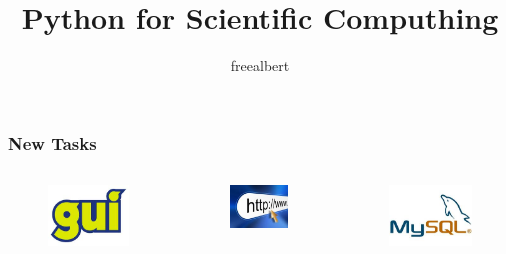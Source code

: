 \documentclass[compress=true]{beamer}
\title{Python for Scientific Computhing}
\author{freealbert}
\institute{Blog: http://dspandlinux.com\\Email: jim2429212@gmail.com}
\begin{document}
\begin{frame}
	\titlepage
\end{frame}
\begin{frame}
	\frametitle{New Tasks}
	\begin{columns}
		\begin{column}{0.333\textwidth}
			\begin{figure}
				\includegraphics[height=0.22\textheight]{gui.png}
			\end{figure}
		\end{column}
		\begin{column}{0.334\textwidth}
			\begin{figure}
				\includegraphics[height=0.22\textheight]{web.png}
			\end{figure}
		\end{column}
		\begin{column}{0.333\textwidth}
			\begin{figure}
				\includegraphics[height=0.22\textheight]{database.png}
			\end{figure}
		\end{column}

\end{columns}
\end{frame}
\end{document}

